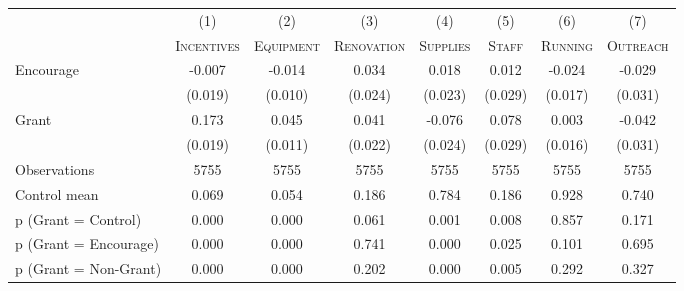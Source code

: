 \begin{tabular*}{\hsize}{@{\hskip\tabcolsep\extracolsep\fill}l*{7}{c}}
\toprule
                    &\multicolumn{1}{c}{(1)}&\multicolumn{1}{c}{(2)}&\multicolumn{1}{c}{(3)}&\multicolumn{1}{c}{(4)}&\multicolumn{1}{c}{(5)}&\multicolumn{1}{c}{(6)}&\multicolumn{1}{c}{(7)}\\
                    &\multicolumn{1}{c}{\textsc{Incentives}}&\multicolumn{1}{c}{\textsc{Equipment}}&\multicolumn{1}{c}{\textsc{Renovation}}&\multicolumn{1}{c}{\textsc{Supplies}}&\multicolumn{1}{c}{\textsc{Staff}}&\multicolumn{1}{c}{\textsc{Running}}&\multicolumn{1}{c}{\textsc{Outreach}}\\
\midrule
Encourage           &      -0.007&      -0.014&       0.034&       0.018&       0.012&      -0.024&      -0.029\\
                    &     (0.019)&     (0.010)&     (0.024)&     (0.023)&     (0.029)&     (0.017)&     (0.031)\\
\addlinespace
Grant               &       0.173&       0.045&       0.041&      -0.076&       0.078&       0.003&      -0.042\\
                    &     (0.019)&     (0.011)&     (0.022)&     (0.024)&     (0.029)&     (0.016)&     (0.031)\\
\midrule
Observations        &        5755&        5755&        5755&        5755&        5755&        5755&        5755\\
Control mean        &       0.069&       0.054&       0.186&       0.784&       0.186&       0.928&       0.740\\
p (Grant = Control) &       0.000&       0.000&       0.061&       0.001&       0.008&       0.857&       0.171\\
p (Grant = Encourage)&       0.000&       0.000&       0.741&       0.000&       0.025&       0.101&       0.695\\
p (Grant = Non-Grant)&       0.000&       0.000&       0.202&       0.000&       0.005&       0.292&       0.327\\
\bottomrule
\end{tabular*}
